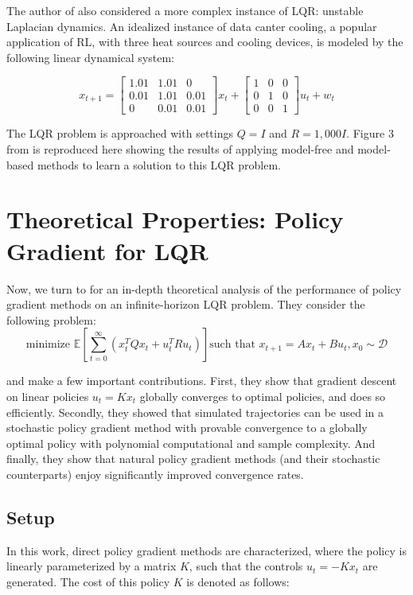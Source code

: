 \documentclass{article}[12pt]
\def\E{\mathbb{E}}
\def \E{\mathbb E}
\begin{document}
The author of \cite{Recht2019} also considered a more complex instance of LQR: unstable Laplacian dynamics. An idealized instance of data canter cooling, a popular application of RL, with three heat sources and cooling devices, is modeled by the following linear dynamical system:

\[
x_{t+1} = 
\begin{bmatrix}
1.01 & 1.01 & 0 \\ 
0.01 & 1.01 & 0.01 \\
0 & 0.01 & 0.01
\end{bmatrix}
x_t + 
\begin{bmatrix}
1 & 0 & 0\\
0 & 1 & 0\\ 
0 & 0 & 1
\end{bmatrix}
u_t + w_t
\]

The LQR problem is approached with settings $Q=I$ and $R = 1,000I$. Figure 3 from \cite{Recht2019} is reproduced here showing the results of applying model-free and model-based methods to learn a solution to this LQR problem. 


\section{Theoretical Properties: Policy Gradient for LQR}

Now, we turn to \cite{Fazel2018} for an in-depth theoretical analysis of the performance of policy gradient methods on an infinite-horizon LQR problem. They consider the following problem:
\begin{equation}
\text{minimize } \E \left[ \sum_{t=0}^\infty (x_t^TQx_t + u_t^TRu_t)\right]
\text{such that } x_{t+1} = Ax_t + Bu_t, x_0 \sim \mathcal{D}
\end{equation}

and make a few important contributions. First, they show that gradient descent on linear policies $u_t = Kx_t$ globally converges to optimal policies, and does so efficiently. Secondly, they showed that simulated trajectories can be used in a stochastic policy gradient method with provable convergence to a globally optimal policy with polynomial computational and sample complexity. And finally, they show that natural policy gradient methods (and their stochastic counterparts) enjoy significantly improved convergence rates.

\subsection{Setup}
In this work, direct policy gradient methods are characterized, where the policy is linearly parameterized by a matrix $K$, such that the controls $u_t = -Kx_t$ are generated. The cost of this policy $K$ is denoted as follows:
\end{document}
